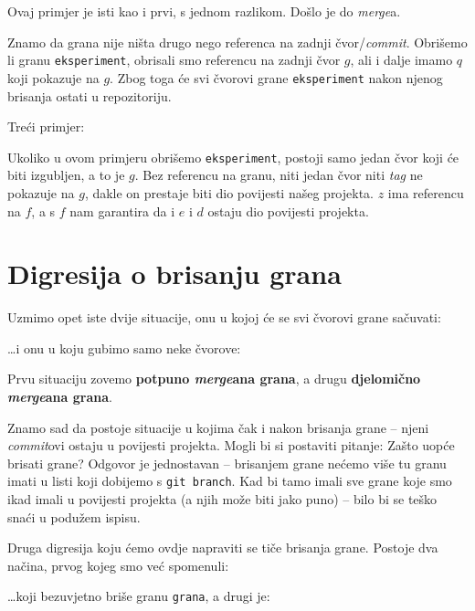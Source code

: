 Ovaj primjer je isti kao i prvi, s jednom razlikom. 
Došlo je do \emph{merge}a.

Znamo da grana nije ništa drugo nego referenca na zadnji čvor/\emph{commit}.
Obrišemo li granu \verb+eksperiment+, obrisali smo referencu na zadnji čvor $g$, ali i dalje imamo $q$ koji pokazuje na $g$.
Zbog toga će svi čvorovi grane \verb+eksperiment+ nakon njenog brisanja ostati u repozitoriju.

Treći primjer:



Ukoliko u ovom primjeru obrišemo \verb+eksperiment+, postoji samo jedan čvor koji će biti izgubljen, a to je $g$.
Bez referencu na granu, niti jedan čvor niti \emph{tag} ne pokazuje na $g$, dakle on prestaje biti dio povijesti našeg projekta.
$z$ ima referencu na $f$, a s $f$ nam garantira da i $e$ i $d$ ostaju dio povijesti projekta.

\section*{Digresija o brisanju grana}

Uzmimo opet iste dvije situacije, onu u kojoj će se svi čvorovi grane sačuvati:



\dots{}i onu u koju gubimo samo neke čvorove:



Prvu situaciju zovemo \textbf{potpuno \emph{merge}ana grana}, a drugu \textbf{djelomično \emph{merge}ana grana}.

Znamo sad da postoje situacije u kojima čak i nakon brisanja grane -- njeni \emph{commit}ovi ostaju u povijesti projekta.
Mogli bi si postaviti pitanje: Zašto uopće brisati grane?
Odgovor je jednostavan -- brisanjem grane nećemo više tu granu imati u listi koji dobijemo s \verb+git branch+.
Kad bi tamo imali sve grane koje smo ikad imali u povijesti projekta (a njih može biti jako puno) -- bilo bi se teško snaći u podužem ispisu.

Druga digresija koju ćemo ovdje napraviti se tiče brisanja grane.
Postoje dva načina, prvog kojeg smo već spomenuli:


\dots{}koji bezuvjetno briše granu \verb+grana+, a drugi je:

